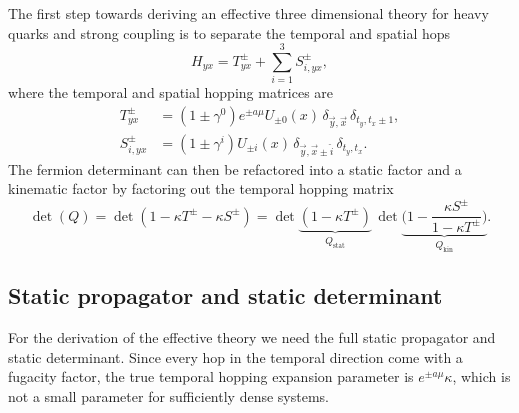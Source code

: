 The first step towards deriving an effective three dimensional theory for heavy
quarks and strong coupling is to separate the temporal and spatial hops
%
\begin{equation}
  H_{yx} = T^{\pm}_{yx} + \sum_{i=1}^3 S_{i,yx}^{\pm},
\end{equation}
%
where the temporal and spatial hopping matrices are
%
\begin{align}
  T^{\pm}_{yx} &= (1 \pm \gamma^{0}) e^{\pm a\mu} U_{\pm 0}(x)\,
    \delta_{\vec{y},\vec{x}} \, \delta_{t_y, t_x\pm1},\\
  S_{i,yx}^{\pm} &= (1\pm \gamma^i) U_{\pm i}(x) \,
    \delta_{\vec{y},\vec{x}\pm\hat{i}} \,\delta_{t_y,t_x}.
\end{align}
%
The fermion determinant can then be refactored into a static factor and a
kinematic factor by factoring out the temporal hopping matrix
%
\begin{equation}
  \det (Q) = \det (1 - \kappa T^{\pm} - \kappa S^{\pm})
   = \det\underbrace{(1 - \kappa T^{\pm})}_{Q_{\text{stat}}} \,
   \det \underbrace{\Big(1 - \frac{\kappa S^{\pm}}{1 - \kappa
       T^{\pm}}\Big)}_{Q_{\text{kin}}}.
\end{equation}

\subsection{Static propagator and static determinant}

For the derivation of the effective theory we need the full static propagator
and static determinant. Since every hop in the temporal direction come with a
fugacity factor, the true temporal hopping expansion parameter is $e^{\pm a\mu}
\kappa$, which is not a small parameter for sufficiently dense systems. 


